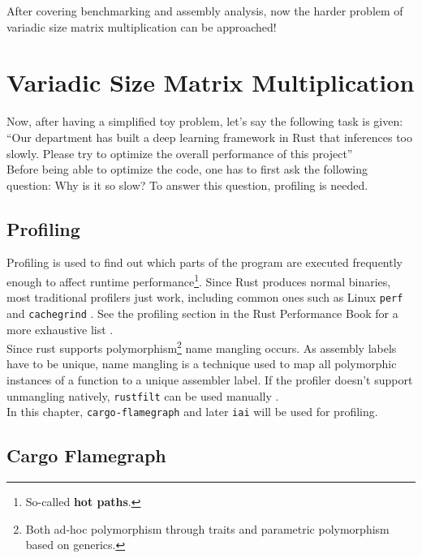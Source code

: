 After covering benchmarking and assembly analysis, now the harder problem of variadic size matrix multiplication can be approached!

\section{Variadic Size Matrix Multiplication}

Now, after having a simplified toy problem, let's say the following task is given:\\

``Our department has built a deep learning framework in Rust that inferences too slowly. Please try to optimize the overall performance of this project''\\

Before being able to optimize the code, one has to first ask the following question: Why is it so slow? To answer this question, profiling is needed.

\subsection{Profiling}

Profiling is used to find out which parts of the program are executed frequently enough to affect runtime performance\footnote{So-called \textbf{hot paths}.}. Since Rust produces normal binaries, most traditional profilers just work, including common ones such as Linux \texttt{perf} \cite{perf} and \texttt{cachegrind} \cite{cachegrind}. See the profiling section in the Rust Performance Book for a more exhaustive list \cite{profiling}.\\

Since rust supports polymorphism\footnote{Both ad-hoc polymorphism through traits and parametric polymorphism based on generics.} name mangling occurs. As assembly labels have to be unique, name mangling is a technique used to map all polymorphic instances of a function to a unique assembler label. If the profiler doesn't support unmangling natively, \texttt{rustfilt} can be used manually \cite{rustfilt}.\\

In this chapter, \texttt{cargo-flamegraph} \cite{flamegraph} and later \texttt{iai} \cite{iai} will be used for profiling.

\subsection{Cargo Flamegraph}

